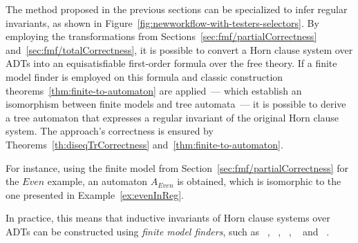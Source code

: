 The method proposed in the previous sections can be specialized to infer regular invariants, as shown in Figure~\cref{fig:newworkflow-with-testers-selectors}. By employing the transformations from Sections~\cref{sec:fmf/partialCorrectness} and~\cref{sec:fmf/totalCorrectness}, it is possible to convert a Horn clause system over ADTs into an equisatisfiable first-order formula over the free theory. If a finite model finder is employed on this formula and classic construction theorems~\ref{thm:finite-to-automaton} are applied~--- which establish an isomorphism between finite models and tree automata~--- it is possible to derive a tree automaton that expresses a regular invariant of the original Horn clause system. The approach's correctness is ensured by Theorems~\ref{th:diseqTrCorrectness} and~\ref{thm:finite-to-automaton}.


For instance, using the finite model from Section~\cref{sec:fmf/partialCorrectness} for the $Even$ example, an automaton $A_{Even}$ is obtained, which is isomorphic to the one presented in Example~\ref{ex:evenInReg}.
 \exampleCostruction

In practice, this means that inductive invariants of Horn clause systems over ADTs can be constructed using \emph{finite model finders}, such as \mace{}~\cite{https://doi.org/10.48550/arxiv.cs/0310055}, \kodkod{}~\cite{10.1007/978-3-540-71209-1_49}, \paradox{}~\cite{claessen2003new}, \cvc{}~\cite{reynolds2013finite} and \vampire{}~\cite{10.1007/978-3-319-40970-2_20}.

